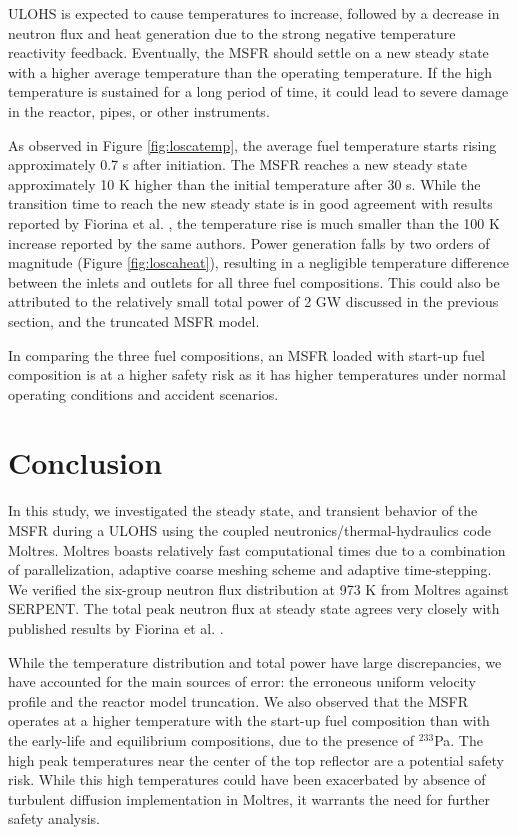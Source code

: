 \documentclass{anstrans}
\begin{document}
	\gls{ULOHS} is expected to cause temperatures to increase,
	followed by a decrease in neutron flux and heat generation due to the
	strong negative temperature reactivity feedback. Eventually, the
	\gls{MSFR} should settle on a new steady state with a higher average
	temperature than the operating temperature. If the high temperature is
	sustained for a long period of time, it could lead to severe damage
	in the reactor, pipes, or other instruments.

	As observed in Figure \ref{fig:loscatemp}, the average fuel temperature
	starts rising approximately 0.7 s after initiation. The \gls{MSFR} reaches
	a new steady state approximately 10 K higher than the initial temperature
	after 30 s. While the transition time to reach the new steady state is in
	good agreement with results reported by
	Fiorina et al. \cite{fiorina_modelling_2014}, the temperature rise is much
	smaller than the 100 K increase reported by the same authors.
	Power generation falls by two orders of
	magnitude (Figure \ref{fig:loscaheat}),
	resulting in a negligible temperature difference between the
	inlets and outlets for all three fuel compositions. This could also be
	attributed to the relatively small total power of 2 GW discussed in the
	previous section, and the truncated \gls{MSFR} model.
	
	In comparing the three fuel compositions, an \gls{MSFR} loaded with
	start-up fuel composition is at a higher safety risk as it has higher
	temperatures under normal operating conditions and accident scenarios.

\section{Conclusion}

	In this study, we investigated the steady state, and transient behavior of
	the \gls{MSFR} during a \gls{ULOHS}
	using the coupled neutronics/thermal-hydraulics code Moltres. Moltres
	boasts relatively fast computational times due to a combination of
	parallelization, adaptive coarse meshing scheme and adaptive time-stepping.
	We verified the six-group neutron flux distribution at 973 K from Moltres
	against SERPENT. The total peak
	neutron flux at steady state agrees very closely with published results by
	Fiorina et al. \cite{fiorina_modelling_2014}.
	
	While the temperature
	distribution and total power have
	large discrepancies, we have accounted for the main sources of error:
	the erroneous uniform velocity profile and the reactor model truncation. We
	also observed that the \gls{MSFR} operates at a higher temperature with the
	start-up fuel composition than with the early-life and equilibrium
	compositions, due to the presence of $^{233}$Pa. The high peak temperatures 
	near the center of the top reflector are a potential safety risk. While
	this high temperatures could have been exacerbated by absence of turbulent
	diffusion implementation in Moltres, it warrants the need for further
	safety analysis.
	
\end{document}
